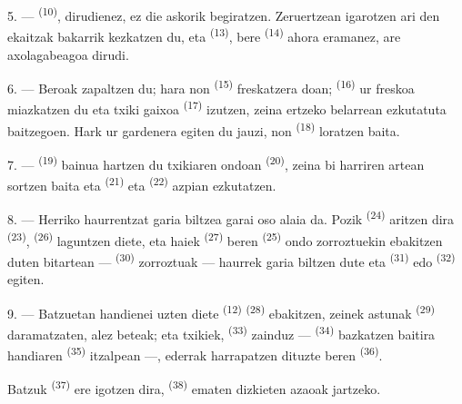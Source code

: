 \VUsaut{5.0mm}
\VUsaut{3.4mm}

5. ---  \textsuperscript{(10)}, dirudienez, ez die askorik
begiratzen. Zeruertzean igarotzen ari den ekaitzak bakarrik kezkatzen du, eta
 \textsuperscript{(13)}, bere 
\textsuperscript{(14)} ahora eramanez, are axolagabeagoa dirudi.

6. --- Beroak zapaltzen du; hara non  \textsuperscript{(15)}
freskatzera doan;  \textsuperscript{(16)} ur freskoa miazkatzen
du eta  txiki gaixoa \textsuperscript{(17)} izutzen, zeina ertzeko
belarrean ezkutatuta baitzegoen. Hark ur gardenera egiten du jauzi, non
 \textsuperscript{(18)} loratzen baita.

7. ---  \textsuperscript{(19)} bainua hartzen du
 txikiaren ondoan \textsuperscript{(20)}, zeina bi harriren
artean sortzen baita eta  \textsuperscript{(21)} eta
 \textsuperscript{(22)} azpian ezkutatzen.

\VUsaut{5.0mm}
\VUsaut{3.4mm}

8. --- Herriko haurrentzat garia biltzea garai oso alaia da. Pozik
 \textsuperscript{(24)} aritzen dira 
\textsuperscript{(23)},  \textsuperscript{(26)} laguntzen
diete, eta haiek  \textsuperscript{(27)} beren 
\textsuperscript{(25)} ondo zorroztuekin ebakitzen duten bitartean ---
 \textsuperscript{(30)} zorroztuak --- haurrek garia
biltzen dute eta  \textsuperscript{(31)} edo 
\textsuperscript{(32)} egiten.

9. --- Batzuetan handienei uzten diete  \textsuperscript{(12)}
 \textsuperscript{(28)} ebakitzen, zeinek
 astunak \textsuperscript{(29)} daramatzaten, alez beteak; eta
txikiek,  \textsuperscript{(33)} zainduz --- 
\textsuperscript{(34)} bazkatzen baitira  handiaren
\textsuperscript{(35)} itzalpean ---,  ederrak harrapatzen
dituzte beren  \textsuperscript{(36)}.

Batzuk  \textsuperscript{(37)} ere igotzen dira, 
\textsuperscript{(38)} ematen dizkieten azaoak jartzeko.

